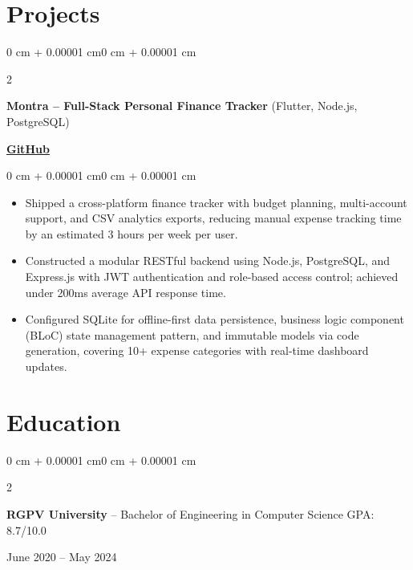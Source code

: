 \documentclass[10pt, letterpaper]{article}
\newenvironment{highlights}{
    \begin{itemize}[
        topsep=0.06 cm,
        parsep=0.06 cm,
        partopsep=0pt,
        itemsep=0pt,
        leftmargin=0 cm + 10pt
    ]
}{
    \end{itemize}
}
\newenvironment{onecolentry}{
    \begin{adjustwidth}{0 cm + 0.00001 cm}{0 cm + 0.00001 cm}
}{
    \end{adjustwidth}
}
\newenvironment{twocolentry}[2][]{
    \onecolentry
    \def\secondColumn{#2}
    \setcolumnwidth{\fill, 4.5 cm}
    \begin{paracol}{2}
}{
    \switchcolumn \raggedleft \secondColumn
    \end{paracol}
    \endonecolentry
}
\begin{document}
\section{Projects}

\begin{twocolentry}{
    \href{https://github.com/chiragdhunna/montra}{\textbf{GitHub}}
}
    \textbf{Montra -- Full-Stack Personal Finance Tracker} (Flutter, Node.js, PostgreSQL)
\end{twocolentry}
\vspace{0.07 cm}
\begin{onecolentry}
    \begin{highlights}
        \item Shipped a cross-platform finance tracker with budget planning, multi-account support, and CSV analytics exports, reducing manual expense tracking time by an estimated 3 hours per week per user.
        \item Constructed a modular RESTful backend using Node.js, PostgreSQL, and Express.js with JWT authentication and role-based access control; achieved under 200ms average API response time.
        \item Configured SQLite for offline-first data persistence, business logic component (BLoC) state management pattern, and immutable models via code generation, covering 10+ expense categories with real-time dashboard updates.
    \end{highlights}
\end{onecolentry}

\section{Education}

\begin{twocolentry}{June 2020 -- May 2024}
    \textbf{RGPV University} -- Bachelor of Engineering in Computer Science \quad GPA: 8.7/10.0
\end{twocolentry}
\end{document}
